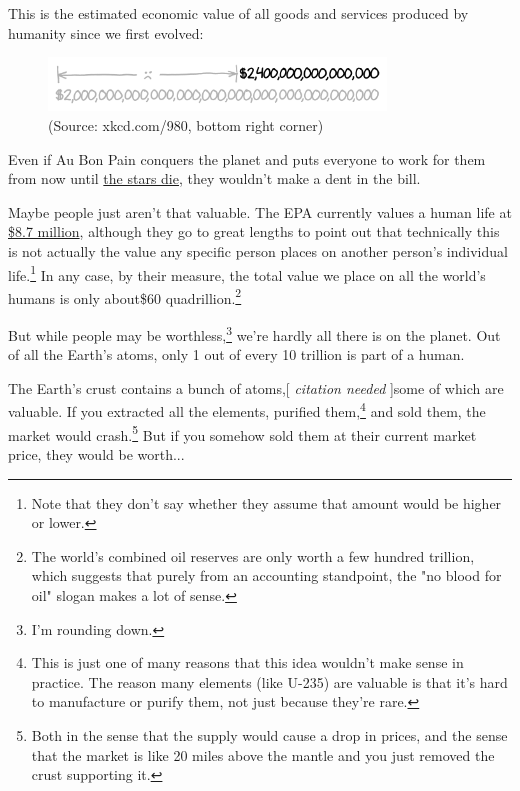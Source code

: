 {{This is the estimated economic value of all goods and services produced by humanity since we first evolved:}

\begin{figure}[!htbp]
\centering
\includegraphics[scale=0.5, max width=0.8\textwidth]{imgs/a/96/gwp.png}
\caption{(Source: xkcd.com/980, bottom right corner)}
\end{figure}

{Even if Au Bon Pain conquers the planet and puts everyone to work for them from now until \href{http://en.wikipedia.org/wiki/The\_Five\_Ages\_of\_the\_Universe\#Stelliferous\_Era}{the stars die}, they wouldn't make a dent in the bill.}

{Maybe people just aren't that valuable. The EPA currently values a human life at \href{http://yosemite.epa.gov/EE\%5Cepa\%5Ceed.nsf/webpages/MortalityRiskValuation.html\#means}{\$8.7 million}, although they go to great lengths to point out that technically this is not actually the value any specific person places on another person's individual life.{\footnote{Note that they don't say whether they assume that amount would be higher or lower.} } In any case, by their measure, the total value we place on all the world's humans is only about\$60 quadrillion.{\footnote{The world's combined oil reserves are only worth a few hundred trillion, which suggests that purely from an accounting standpoint, the "no blood for oil" slogan makes a lot of sense.} } }

{But while people may be worthless,{\footnote{I'm rounding down.} } we're hardly all there is on the planet. Out of all the Earth's atoms, only 1 out of every 10 trillion is part of a human.}

{The Earth's crust contains a bunch of atoms,[ \emph{citation needed} ]some of which are valuable. If you extracted all the elements, purified them,{\footnote{This is just one of many reasons that this idea wouldn't make sense in practice. The reason many elements (like U-235) are valuable is that it's hard to manufacture or purify them, not just because they're rare.} } and sold them, the market would crash.{\footnote{Both in the sense that the supply would cause a drop in prices, and the sense that the market is like 20 miles above the mantle and you just removed the crust supporting it.} } But if you somehow sold them at their current market price, they would be worth...}

}
